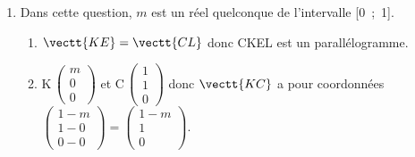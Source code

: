 \begin{enumerate}[resume]
\item Dans cette question, $m$ est un réel quelconque de l'intervalle [0~;~1].
	\begin{enumerate}
		\item 
{}		

$\vectt{KE} = \vectt{CL}$ donc CKEL est un parallélogramme.
		
		\item
K\,$\begin{pmatrix} m\\0\\0 \end{pmatrix}$ et
C\,$\begin{pmatrix} 1\\1\\0 \end{pmatrix}$
donc $\vectt{KC}$ a pour coordonnées
$\begin{pmatrix} 1-m\\1-0\\0-0 \end{pmatrix} = \begin{pmatrix} 1-m\\1\\0 \end{pmatrix}$.


\end{enumerate}
\end{enumerate}
